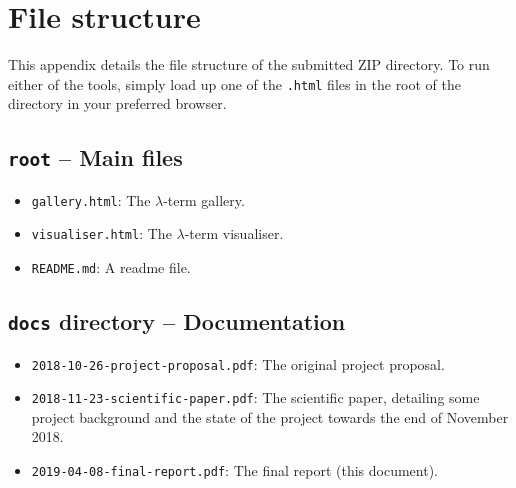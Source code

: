 \documentclass[11pt]{article}
\begin{document}
\newpage
\appendix

\section{File structure}
\label{sec:file-structure}
This appendix details the file structure of the submitted ZIP directory. To run either of the tools, simply load up one of the \texttt{.html} files in the root of the directory in your preferred browser.

\subsection{\texttt{root} -- Main files}
\begin{itemize}
    \item \texttt{gallery.html}: The $\lambda$-term gallery.
    \item \texttt{visualiser.html}: The $\lambda$-term visualiser.
    \item \texttt{README.md}: A readme file.
\end{itemize}

\subsection{\texttt{docs} directory -- Documentation}
\begin{itemize}
    \item \texttt{2018-10-26-project-proposal.pdf}: The original project proposal.
    \item \texttt{2018-11-23-scientific-paper.pdf}: The scientific paper, detailing some project background and the state of the project towards the end of November 2018.
    \item \texttt{2019-04-08-final-report.pdf}: The final report (this document).
\end{itemize}
\end{document}
